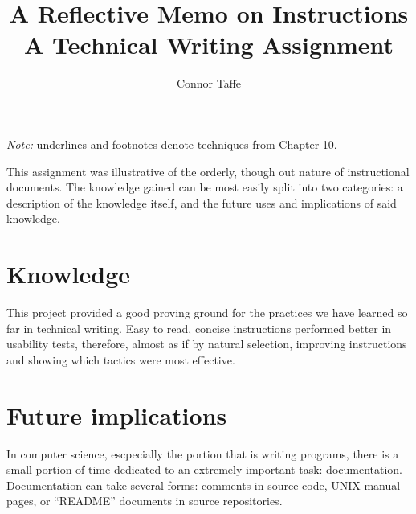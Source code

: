 \documentclass{memoir}
\title{
A Reflective Memo on Instructions
\\\vspace{2mm}
\large
A Technical Writing Assignment
}
\author{Connor Taffe}
\begin{document}
	\maketitle

	\emph{Note:} underlines and footnotes denote techniques from Chapter 10.\vspace{2mm}

This assignment was illustrative of the orderly, though out nature of instructional documents. The knowledge gained can be most easily split into two categories: a description of the knowledge itself, and the future uses and implications of said knowledge.

\section{Knowledge}

This project provided a good proving ground for the practices we have learned so far in technical writing. Easy to read, concise instructions performed better in usability tests, therefore, almost as if by natural selection, improving instructions and showing which tactics were most effective.

\section{Future implications}

In computer science, escpecially the portion that is writing programs, there is a small portion of time dedicated to an extremely important task: documentation. Documentation can take several forms: comments in source code, UNIX manual pages, or ``README'' documents in source repositories.
\end{document}
